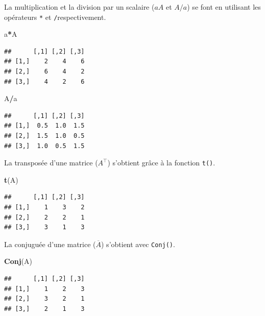 \documentclass[
  11pt,
]{book}
\newenvironment{Shaded}{\begin{snugshade}}{\end{snugshade}}
\newcommand{\KeywordTok}[1]{\textcolor[rgb]{0.13,0.29,0.53}{\textbf{#1}}}
\newcommand{\NormalTok}[1]{#1}
\newcommand{\OperatorTok}[1]{\textcolor[rgb]{0.81,0.36,0.00}{\textbf{#1}}}
\numberwithin{equation}{section}
\numberwithin{countremarque}{section}
\begin{document}
La multiplication et la division par un scalaire (\(aA\) et \(A/a\)) se font en utilisant les opérateurs \texttt{*} et \texttt{/}respectivement.

\begin{Shaded}
\begin{Highlighting}[]
\NormalTok{a}\OperatorTok{*}\NormalTok{A}
\end{Highlighting}
\end{Shaded}

\begin{lstlisting}
##      [,1] [,2] [,3]
## [1,]    2    4    6
## [2,]    6    4    2
## [3,]    4    2    6
\end{lstlisting}

\begin{Shaded}
\begin{Highlighting}[]
\NormalTok{A}\OperatorTok{/}\NormalTok{a}
\end{Highlighting}
\end{Shaded}

\begin{lstlisting}
##      [,1] [,2] [,3]
## [1,]  0.5  1.0  1.5
## [2,]  1.5  1.0  0.5
## [3,]  1.0  0.5  1.5
\end{lstlisting}

La transposée d'une matrice (\(A^\top\)) s'obtient grâce à la fonction \texttt{t()}.

\begin{Shaded}
\begin{Highlighting}[]
\KeywordTok{t}\NormalTok{(A)}
\end{Highlighting}
\end{Shaded}

\begin{lstlisting}
##      [,1] [,2] [,3]
## [1,]    1    3    2
## [2,]    2    2    1
## [3,]    3    1    3
\end{lstlisting}

La conjuguée d'une matrice (\(\overline{A}\)) s'obtient avec \texttt{Conj()}.

\begin{Shaded}
\begin{Highlighting}[]
\KeywordTok{Conj}\NormalTok{(A)}
\end{Highlighting}
\end{Shaded}

\begin{lstlisting}
##      [,1] [,2] [,3]
## [1,]    1    2    3
## [2,]    3    2    1
## [3,]    2    1    3
\end{lstlisting}
\end{document}
